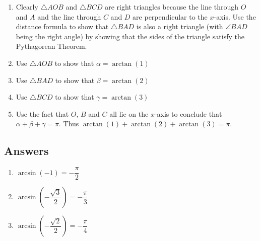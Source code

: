 \documentclass{ximera}
\begin{document}
\begin{enumerate}
\begin{center}
\end{center}

\begin{enumerate}

\item Clearly $\triangle AOB$ and $\triangle BCD$ are right triangles because the line through $O$ and $A$ and the line through $C$ and $D$ are perpendicular to the $x$-axis.  Use the distance formula to show that $\triangle BAD$ is also a right triangle (with $\angle BAD$ being the right angle) by showing that the sides of the triangle satisfy the Pythagorean Theorem.

\item Use $\triangle AOB$ to show that $\alpha = \arctan(1)$
\item Use $\triangle BAD$ to show that $\beta = \arctan(2)$
\item Use $\triangle BCD$ to show that $\gamma = \arctan(3)$

\item Use the fact that $O$, $B$ and $C$ all lie on the $x$-axis to conclude that $\alpha + \beta + \gamma = \pi$.  Thus $\arctan(1) + \arctan(2) + \arctan(3) = \pi$.

\end{enumerate}

\end{enumerate}

\newpage

\subsection{Answers}

 \begin{multicols}{3} 

\begin{enumerate}

\item $\arcsin \left( -1 \right) = -\dfrac{\pi}{2}$ 
\item $\arcsin \left( -\dfrac{\sqrt{3}}{2} \right) = -\dfrac{\pi}{3}$
\item $\arcsin \left( -\dfrac{\sqrt{2}}{2} \right) = -\dfrac{\pi}{4}$

\setcounter{HW}{\value{enumi}}

\end{enumerate}

\end{multicols}
\end{document}
